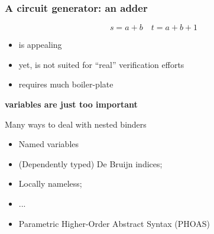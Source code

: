 \documentclass[9pt]{beamer}
\begin{document}
\begin{frame}
  \frametitle{A circuit generator: an adder}

  \begin{center}
    \begin{displaymath}
      s =  a + b \quad  t =  a + b + 1
    \end{displaymath}
  \end{center}
  

\end{frame}

{
  \begin{itemize}
  \item is appealing
  \item yet, is not suited for ``real'' verification efforts
  \item requires much boiler-plate
  \end{itemize}

  \vspace{1em}
  {\bf variables are just too important}
}

{

  Many ways to deal with nested binders
  \begin{itemize}
  \item Named variables
  \item (Dependently typed) De Bruijn indices;
  \item Locally nameless;
  \item ...
  \item<2> \alert{Parametric Higher-Order Abstract Syntax} (PHOAS)
  \end{itemize}
  \vspace{1em}
  }
\end{document}
